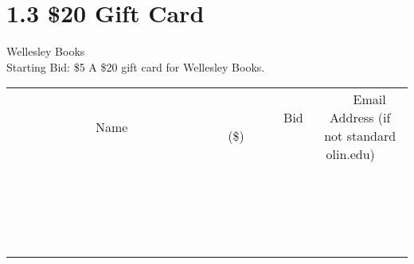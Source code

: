 \documentclass[11pt]{article}
\begin{document}
\section*{1.3 \$20 Gift Card}
Wellesley Books
\\
Starting Bid: \$5
\newline
A \$20 gift card for Wellesley Books.
\\[3ex]
\begin{tabular}{c c c}
~~~~~~~~~~~~~Name~~~~~~~~~~~~~ & ~~~~~~~~~Bid (\$)~~~~~~~~~  & ~~~Email Address (if not standard olin.edu)~~~\\
 & & \\
\hline
 & & \\
\hline
 & & \\
\hline
 & & \\
\hline
 & & \\
\hline
 & & \\
\hline
 & & \\
\hline
 & & \\
\hline
 & & \\
\hline
 & & \\
\hline
 & & \\
\hline
 & & \\
\hline
 & & \\
\hline
 & & \\
\hline
 & & \\
\hline
 & & \\
\hline
 & & \\
\hline
 & & \\
\hline
 & & \\
\hline
\end{tabular}
\newpage
\end{document}
